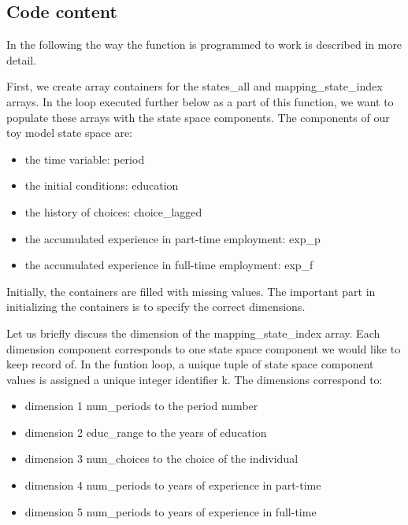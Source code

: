 \documentclass[letterpaper,10pt,english]{sphinxmanual}
\begin{document}
\subsection{Code content}
\label{\detokenize{developer_docs:code-content}}
In the following the way the function is programmed to work is described in more detail.

First, we create array containers for the states\_all and mapping\_state\_index arrays. In the loop executed further below as a part of this function, we want to populate these arrays with the state space components. The components of our toy model state space are:
\begin{itemize}
\item {} 
the time variable: period

\item {} 
the initial conditions: education

\item {} 
the history of choices: choice\_lagged

\item {} 
the accumulated experience in part-time employment: exp\_p

\item {} 
the accumulated experience in full-time employment: exp\_f

\end{itemize}

Initially, the containers are filled with missing values. The important part in initializing the containers is to specify the correct dimensions.

Let us briefly discuss the dimension of the mapping\_state\_index array. Each dimension component corresponds to one state space component we would like to keep record of. In the funtion loop, a unique tuple of state space component values is assigned a unique integer identifier k. The dimensions correspond to:
\begin{itemize}
\item {} 
dimension 1 num\_periods to the period number

\item {} 
dimension 2 educ\_range to the years of education

\item {} 
dimension 3 num\_choices to the choice of the individual

\item {} 
dimension 4 num\_periods to years of experience in part-time

\item {} 
dimension 5 num\_periods to years of experience in full-time

\end{itemize}
\end{document}
